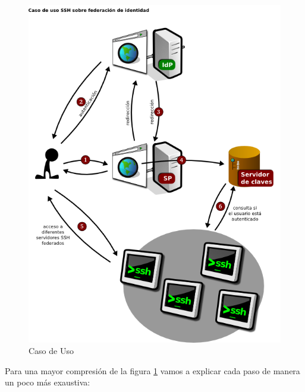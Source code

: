     \begin{figure}[htp!]
        \centering
            \includegraphics[width=\textwidth]{img/casodeuso1.png}
            \caption{Caso de Uso}
        \label{fig:casodeuso}
    \end{figure}

    Para una mayor compresión de la figura \ref{fig:casodeuso} vamos a
    explicar cada paso de manera un poco más exaustiva:

